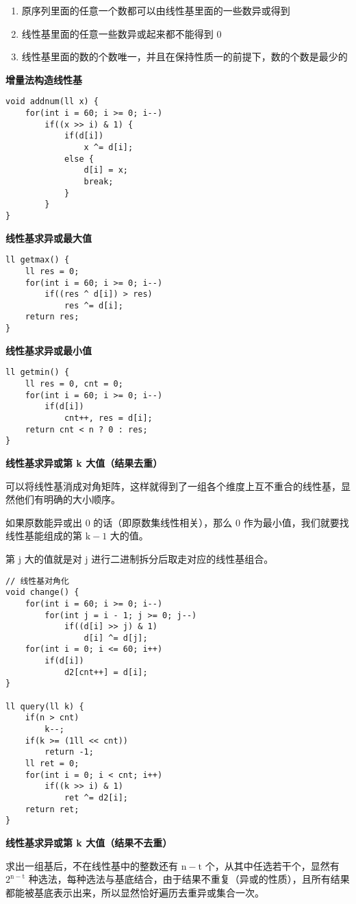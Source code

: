 \documentclass[UTF8]{article}
\begin{document}
\begin{enumerate}
	\item 原序列里面的任意一个数都可以由线性基里面的一些数异或得到
	\item 线性基里面的任意一些数异或起来都不能得到 0
	\item 线性基里面的数的个数唯一，并且在保持性质一的前提下，数的个数是最少的
\end{enumerate}
\noindent \textbf{增量法构造线性基} 
\begin{lstlisting}[caption=增量法构造线性基]
void addnum(ll x) {
	for(int i = 60; i >= 0; i--)
		if((x >> i) & 1) {
			if(d[i]) 
				x ^= d[i];
			else {
				d[i] = x;
				break;
			}
		}
}
\end{lstlisting}
\noindent \textbf{线性基求异或最大值} 
\begin{lstlisting}[caption=线性基求异或最大值]
ll getmax() {
    ll res = 0;
    for(int i = 60; i >= 0; i--)
        if((res ^ d[i]) > res)
            res ^= d[i];
    return res;
}
\end{lstlisting}
\noindent \textbf{线性基求异或最小值} 
\begin{lstlisting}[caption=线性基求异或最小值]
ll getmin() {
    ll res = 0, cnt = 0;
    for(int i = 60; i >= 0; i--)
        if(d[i])
            cnt++, res = d[i];
    return cnt < n ? 0 : res;
}
\end{lstlisting}
\noindent \textbf{线性基求异或第 k 大值（结果去重）} 

可以将线性基消成对角矩阵，这样就得到了一组各个维度上互不重合的线性基，显然他们有明确的大小顺序。

如果原数能异或出 $\mathrm{0}$ 的话（即原数集线性相关），那么 $\mathrm{0}$ 作为最小值，我们就要找线性基能组成的第 $\mathrm{k - 1}$ 大的值。

第 $\mathrm{j}$ 大的值就是对 $\mathrm{j}$ 进行二进制拆分后取走对应的线性基组合。
\begin{lstlisting}[caption=线性基求异或第 k 大值（结果去重）]
// 线性基对角化
void change() {
	for(int i = 60; i >= 0; i--) 
		for(int j = i - 1; j >= 0; j--)
			if((d[i] >> j) & 1)
				d[i] ^= d[j];
	for(int i = 0; i <= 60; i++)
		if(d[i])
			d2[cnt++] = d[i];
}

ll query(ll k) {
	if(n > cnt)
		k--;
	if(k >= (1ll << cnt)) 
		return -1;
	ll ret = 0;
	for(int i = 0; i < cnt; i++)
		if((k >> i) & 1)
			ret ^= d2[i];
	return ret;
}
\end{lstlisting}
\noindent \textbf{线性基求异或第 k 大值（结果不去重）} 

求出一组基后，不在线性基中的整数还有 $\mathrm{n - t}$ 个，从其中任选若干个，显然有 $\mathrm{2^{n - t}}$ 种选法，每种选法与基底结合，由于结果不重复（异或的性质），且所有结果都能被基底表示出来，所以显然恰好遍历去重异或集合一次。
\end{document}
